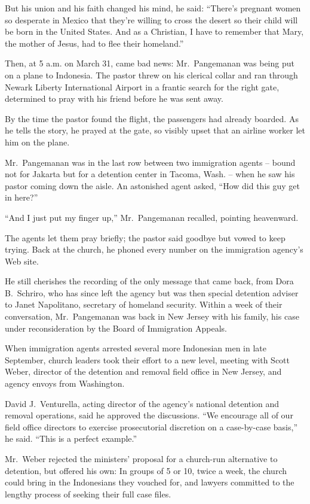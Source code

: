 ﻿\documentclass[12pt]{article}
\begin{document}
But his union and his faith changed his mind, he said: ``There's pregnant women so desperate in
Mexico that they're willing to cross the desert so their child will be born in the United States.
And as a Christian, I have to remember that Mary, the mother of Jesus, had to flee their homeland.''

Then, at 5 a.m. on March 31, came bad news: Mr.~Pangemanan was being put on a plane to Indonesia.
The pastor threw on his clerical collar and ran through Newark Liberty International Airport in a
frantic search for the right gate, determined to pray with his friend before he was sent away.

By the time the pastor found the flight, the passengers had already boarded. As he tells the story,
he prayed at the gate, so visibly upset that an airline worker let him on the plane.

Mr.~Pangemanan was in the last row between two immigration agents -- bound not for Jakarta but for a
detention center in Tacoma, Wash. -- when he saw his pastor coming down the aisle. An astonished
agent asked, ``How did this guy get in here?''

``And I just put my finger up,'' Mr.~Pangemanan recalled, pointing heavenward.

The agents let them pray briefly; the pastor said goodbye but vowed to keep trying. Back at the
church, he phoned every number on the immigration agency's Web site.

He still cherishes the recording of the only message that came back, from Dora B.~Schriro, who has
since left the agency but was then special detention adviser to Janet Napolitano, secretary of
homeland security. Within a week of their conversation, Mr.~Pangemanan was back in New Jersey with
his family, his case under reconsideration by the Board of Immigration Appeals.

When immigration agents arrested several more Indonesian men in late September, church leaders took
their effort to a new level, meeting with Scott Weber, director of the detention and removal field
office in New Jersey, and agency envoys from Washington.

David J.~Venturella, acting director of the agency's national detention and removal operations, said
he approved the discussions. ``We encourage all of our field office directors to exercise
prosecutorial discretion on a case-by-case basis,'' he said. ``This is a perfect example.''

Mr.~Weber rejected the ministers' proposal for a church-run alternative to detention, but offered
his own: In groups of 5 or 10, twice a week, the church could bring in the Indonesians they vouched
for, and lawyers committed to the lengthy process of seeking their full case files.
\end{document}
